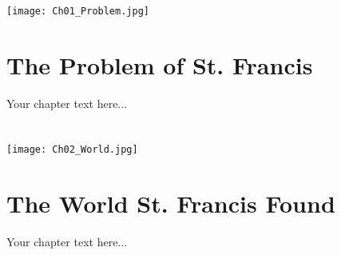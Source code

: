 \documentclass[twoside,openright]{book}
\begin{document}
\chapter*{} %
\thispagestyle{empty} %
\texttt{[image: Ch01\_Problem.jpg]}
\clearpage

\chapter{The Problem of St. Francis}
Your chapter text here...

\chapter*{}
\thispagestyle{empty}
\texttt{[image: Ch02\_World.jpg]}
\clearpage

\chapter{The World St. Francis Found}
Your chapter text here...

\end{document}
